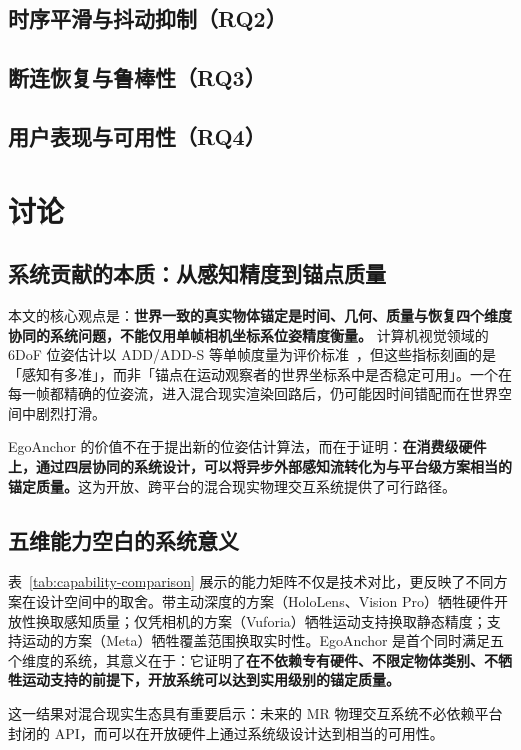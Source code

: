 \documentclass[review]{vgtc}
\begin{document}
\subsection{时序平滑与抖动抑制（RQ2）}
\subsection{断连恢复与鲁棒性（RQ3）}
\subsection{用户表现与可用性（RQ4）}

\section{讨论}

\subsection{系统贡献的本质：从感知精度到锚点质量}

本文的核心观点是：\textbf{世界一致的真实物体锚定是时间、几何、质量与恢复四个维度协同的系统问题，不能仅用单帧相机坐标系位姿精度衡量。} 计算机视觉领域的 6DoF 位姿估计以 ADD/ADD-S 等单帧度量为评价标准~\cite{hinterstoisser2012add,posecnn2017}，但这些指标刻画的是「感知有多准」，而非「锚点在运动观察者的世界坐标系中是否稳定可用」。一个在每一帧都精确的位姿流，进入混合现实渲染回路后，仍可能因时间错配而在世界空间中剧烈打滑。

EgoAnchor 的价值不在于提出新的位姿估计算法，而在于证明：\textbf{在消费级硬件上，通过四层协同的系统设计，可以将异步外部感知流转化为与平台级方案相当的锚定质量。}这为开放、跨平台的混合现实物理交互系统提供了可行路径。

\subsection{五维能力空白的系统意义}

表~\ref{tab:capability-comparison} 展示的能力矩阵不仅是技术对比，更反映了不同方案在设计空间中的取舍。带主动深度的方案（HoloLens、Vision Pro）牺牲硬件开放性换取感知质量；仅凭相机的方案（Vuforia）牺牲运动支持换取静态精度；支持运动的方案（Meta）牺牲覆盖范围换取实时性。EgoAnchor 是首个同时满足五个维度的系统，其意义在于：它证明了\textbf{在不依赖专有硬件、不限定物体类别、不牺牲运动支持的前提下，开放系统可以达到实用级别的锚定质量。}

这一结果对混合现实生态具有重要启示：未来的 MR 物理交互系统不必依赖平台封闭的 API，而可以在开放硬件上通过系统级设计达到相当的可用性。
\end{document}
